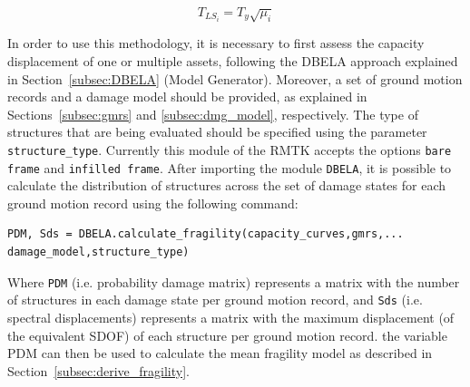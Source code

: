 \begin{equation}
T_{LS_i} = T_y\sqrt{\mu_{i}}
\end{equation}

In order to use this methodology, it is necessary to first assess the capacity displacement of one or multiple assets, following the DBELA approach explained in Section~\ref{subsec:DBELA} (Model Generator). Moreover, a set of ground motion records and a damage model should be provided, as explained in Sections~\ref{subsec:gmrs} and \ref{subsec:dmg_model}, respectively. The type of structures that are being evaluated should be specified using the parameter \verb=structure_type=. Currently this module of the RMTK accepts the options \verb=bare frame= and \verb=infilled frame=. After importing the module \verb=DBELA=, it is possible to calculate the distribution of structures across the set of damage states for each ground motion record using the following command:

\begin{Verbatim}[frame=single, commandchars=\\\{\}, samepage=true]
PDM, Sds = DBELA.calculate_fragility(capacity_curves,gmrs,...
damage_model,structure_type)
\end{Verbatim}

Where \verb=PDM= (i.e. probability damage matrix) represents a matrix with the number of structures in each damage state per ground motion record, and \verb=Sds= (i.e. spectral displacements) represents a matrix with the maximum displacement (of the equivalent SDOF) of each structure per ground motion record. the variable PDM can then be used to calculate the mean fragility model as described in Section~\ref{subsec:derive_fragility}.